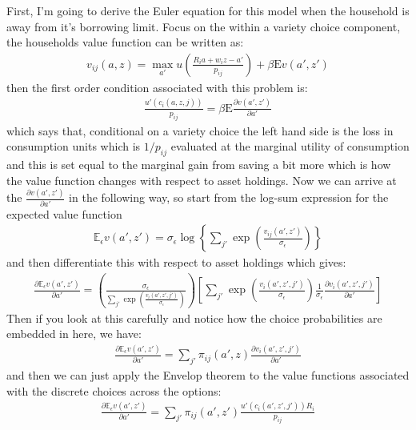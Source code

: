 \documentclass[12pt,pdftex]{article}
\begin{document}
\begin{onehalfspacing}
First, I'm going to derive the Euler equation for this model when the household is away from it's borrowing limit. Focus on the within a variety choice component, the households value function can be written as:
\begin{align}
v_{ij}(a, z) = \max_{a'} u \left( \frac{R_i a + w_i z - a'}{p_{ij}} \right) + \beta  \mathrm{E} v(a', z')
\end{align}
then the first order condition associated with this problem is:
\begin{align}
\frac{u'(c_{i}(a, z, j))}{p_{ij}} = \beta \mathrm{E} \frac{\partial v(a', z')}{\partial a'}
\end{align}
which says that, conditional on a variety choice the left hand side is the loss in consumption units which is $1 / p_{ij}$ evaluated at the marginal utility of consumption and this is set equal to the marginal gain from saving a bit more which is how the value function changes with respect to asset holdings. Now we can arrive at the $\frac{\partial v(a', z')}{\partial a'}$ in the following way, so start from the log-sum expression for the expected value function
\begin{align}
\mathbb{E}_{\epsilon} v(a', z') =  \sigma_{\epsilon} \log \left\{ \sum_{j'} \exp \left( \frac{  v_{ij}(a', z')}{\sigma_{\epsilon}} \right) \right\}
\end{align}
and then differentiate this with respect to asset holdings which gives:
\begin{align}
\frac{\partial \mathbb{E}_{\epsilon} v(a', z')}{\partial a'} = \left( \frac{\sigma_{\epsilon}}{\sum_{j'} \exp \left( \frac{  v_{i}(a', z', j')}{\sigma_{\epsilon}}\right)} \right)
\left[ \sum_{j'} \exp \left( \frac{  v_{i}(a', z', j')}{\sigma_{\epsilon}}\right) \frac{1}{\sigma_{\epsilon}} \frac{\partial v_{i}(a', z', j')}{\partial a'}  \right]
\end{align}
Then if you look at this carefully and notice how the choice probabilities are embedded in here, we have:
\begin{align}
\frac{\partial \mathbb{E}_{\epsilon} v(a', z')}{\partial a'} = \sum_{j'} \pi_{ij}(a', z) \frac{\partial v_{i}(a', z', j')}{\partial a'}
\label{apx-eq:expected-value-fun-partial}
\end{align}
and then we can just apply the Envelop theorem to the value functions associated with the discrete choices across the options:
\begin{align}
\frac{\partial \mathbb{E}_{\epsilon} v(a', z')}{\partial a'} = \sum_{j'} \pi_{ij}(a', z') \frac{u'(c_{i}(a', z', j'))R_{i}}{p_{ij}}

\end{align}
\end{onehalfspacing}
\end{document}

